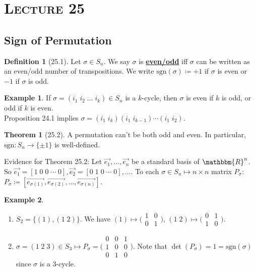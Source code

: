 \documentclass{article}
\newcommand{\R}{\mathbbm{R}}
\newcommand{\coleq}{\coloneqq}
\newcommand{\define}[1]{\textbf{\underline{#1}}}
\newcommand{\func}[3]{#1: #2 \to #3}
\theoremstyle{definition}
\newtheorem*{defn}{Definition}
\newtheorem*{thm}{Theorem}
\newtheorem*{ex}{Example}
\theoremstyle{remark}
\newcommand{\sgn}{\mathrm{sgn}}
\begin{document}
    \section*{\textbf{\textsc{Lecture 25}}}{
        \subsection*{Sign of Permutation}{
            \begin{defn}[25.1]
                Let $\sigma\in S_n$. We say $\sigma$ is \define{even/odd} iff $\sigma$ can be written as an even/odd number of transpositions. We write $\sgn(\sigma)\coleq +1$ if $\sigma$ is even or $-1$ if $\sigma$ is odd.
            \end{defn}
            
            \begin{ex}
                If $\sigma=(i_1\;i_2\;\ldots\;i_k)\in S_n$ is a $k$-cycle, then $\sigma$ is even if $k$ is odd, or odd if $k$ is even.\\
                Proposition 24.1 implies $\sigma=(i_1\;i_k)(i_1\;i_{k-1})\cdots(i_1\;i_2)$.
            \end{ex}
            
            \begin{thm}[25.2]
                A permutation can't be both odd and even. In particular, $\func{\sgn}{S_n}{\{\pm1\}}$ is well-defined.
            \end{thm}
            
            \noindent Evidence for Theorem 25.2: Let $\Vec{e_1},\ldots,\Vec{e_n}$ be a standard basis of $\R^n$. So $\Vec{e_1}=[1\;0\;0\;\cdots\;0],\Vec{e_2}=[0\;1\;0\;\cdots\;0],\ldots$. To each $\sigma\in S_n \mapsto n\times n$ matrix $P_\sigma$:\\
            $P_\sigma\coleq[\Vec{e_{\sigma(1)}},\Vec{e_{\sigma(2)}},\ldots,\Vec{e_{\sigma(n)}}]$.
            
            \begin{ex}
                \begin{enumerate}
                    \item $S_2=\{(1),(1\;2)\}$. We have $(1)\mapsto \big(\begin{smallmatrix} 1&0 \\ 0&1\end{smallmatrix}\big)$, $(1\;2)\mapsto \big(\begin{smallmatrix} 0&1 \\ 1&0\end{smallmatrix}\big)$.
                    \item $\sigma=(1\;2\;3)\in S_3\mapsto P_\sigma=\Big(\begin{smallmatrix} 0&0&1 \\ 1&0&0 \\ 0&1&0\end{smallmatrix}\Big)$. Note that $\det(P_\sigma)=1=\sgn(\sigma)$ since $\sigma$ is a 3-cycle.
                \end{enumerate}    
            \end{ex}
            
}}
\end{document}
